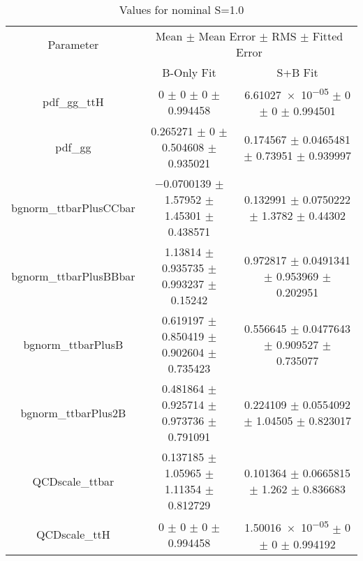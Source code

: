 \begin{table}
\centering
\caption{Values for nominal S=1.0}
\begin{tabular}{ccc}
\toprule
Parameter & \multicolumn{2}{c}{Mean $\pm$ Mean Error $\pm$ RMS $\pm$ Fitted Error}\\
 & B-Only Fit & S+B Fit\\
\midrule
pdf\_gg\_ttH & \num{0} $\pm$ \num{0} $\pm$ \num{0} $\pm$ \num{0.994458} & \num{6.61027e-05} $\pm$ \num{0} $\pm$ \num{0} $\pm$ \num{0.994501}\\
pdf\_gg & \num{0.265271} $\pm$ \num{0} $\pm$ \num{0.504608} $\pm$ \num{0.935021} & \num{0.174567} $\pm$ \num{0.0465481} $\pm$ \num{0.73951} $\pm$ \num{0.939997}\\
bgnorm\_ttbarPlusCCbar & \num{-0.0700139} $\pm$ \num{1.57952} $\pm$ \num{1.45301} $\pm$ \num{0.438571} & \num{0.132991} $\pm$ \num{0.0750222} $\pm$ \num{1.3782} $\pm$ \num{0.44302}\\
bgnorm\_ttbarPlusBBbar & \num{1.13814} $\pm$ \num{0.935735} $\pm$ \num{0.993237} $\pm$ \num{0.15242} & \num{0.972817} $\pm$ \num{0.0491341} $\pm$ \num{0.953969} $\pm$ \num{0.202951}\\
bgnorm\_ttbarPlusB & \num{0.619197} $\pm$ \num{0.850419} $\pm$ \num{0.902604} $\pm$ \num{0.735423} & \num{0.556645} $\pm$ \num{0.0477643} $\pm$ \num{0.909527} $\pm$ \num{0.735077}\\
bgnorm\_ttbarPlus2B & \num{0.481864} $\pm$ \num{0.925714} $\pm$ \num{0.973736} $\pm$ \num{0.791091} & \num{0.224109} $\pm$ \num{0.0554092} $\pm$ \num{1.04505} $\pm$ \num{0.823017}\\
QCDscale\_ttbar & \num{0.137185} $\pm$ \num{1.05965} $\pm$ \num{1.11354} $\pm$ \num{0.812729} & \num{0.101364} $\pm$ \num{0.0665815} $\pm$ \num{1.262} $\pm$ \num{0.836683}\\
QCDscale\_ttH & \num{0} $\pm$ \num{0} $\pm$ \num{0} $\pm$ \num{0.994458} & \num{1.50016e-05} $\pm$ \num{0} $\pm$ \num{0} $\pm$ \num{0.994192}\\
\bottomrule
\end{tabular}
\end{table}